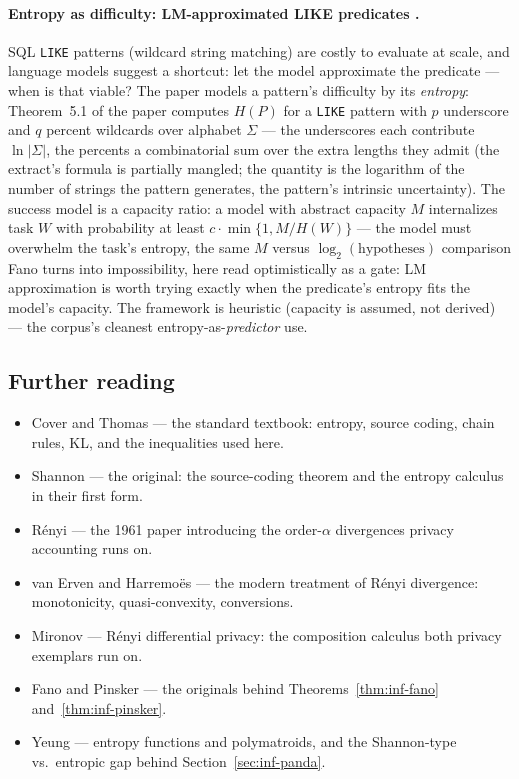 \paragraph{Entropy as difficulty: LM-approximated LIKE predicates
\citep{sigmod26-237}.}
SQL \texttt{LIKE} patterns (wildcard string matching) are costly to evaluate at
scale, and language models suggest a shortcut: let the model approximate the
predicate --- when is that viable? The paper models a pattern's difficulty by its
\emph{entropy}: Theorem~5.1 of the paper computes $H(P)$ for a \texttt{LIKE} pattern
with $p$ underscore and $q$ percent wildcards over alphabet $\Sigma$ --- the
underscores each contribute $\ln|\Sigma|$, the percents a combinatorial sum over the
extra lengths they admit (the extract's formula is partially mangled; the quantity is
the logarithm of the number of strings the pattern generates, the pattern's intrinsic
uncertainty). The success model is a capacity ratio: a model with abstract capacity
$M$ internalizes task $W$ with probability at least $c\cdot\min\{1, M/H(W)\}$ --- the
model must overwhelm the task's entropy, the same $M$ versus
$\log_2(\text{hypotheses})$ comparison Fano turns into impossibility, here read
optimistically as a gate: LM approximation is worth trying exactly when the
predicate's entropy fits the model's capacity. The framework is heuristic (capacity
is assumed, not derived) --- the corpus's cleanest entropy-as-\emph{predictor} use.

\subsection{Further reading}

\begin{itemize}
\item Cover and Thomas \citep{information-theory-bg2} --- the standard textbook:
  entropy, source coding, chain rules, KL, and the inequalities used here.
\item Shannon \citep{information-theory-bg1} --- the original: the source-coding
  theorem and the entropy calculus in their first form.
\item R\'enyi \citep{information-theory-bg3} --- the 1961 paper introducing the
  order-$\alpha$ divergences privacy accounting runs on.
\item van Erven and Harremo\"es \citep{information-theory-bg4} --- the modern
  treatment of R\'enyi divergence: monotonicity, quasi-convexity, conversions.
\item Mironov \citep{information-theory-bg5} --- R\'enyi differential privacy: the
  composition calculus both privacy exemplars run on.
\item Fano \citep{information-theory-bg6} and Pinsker \citep{information-theory-bg7}
  --- the originals behind Theorems~\ref{thm:inf-fano} and~\ref{thm:inf-pinsker}.
\item Yeung \citep{information-theory-bg8} --- entropy functions and polymatroids,
  and the Shannon-type vs.\ entropic gap behind Section~\ref{sec:inf-panda}.
\end{itemize}

